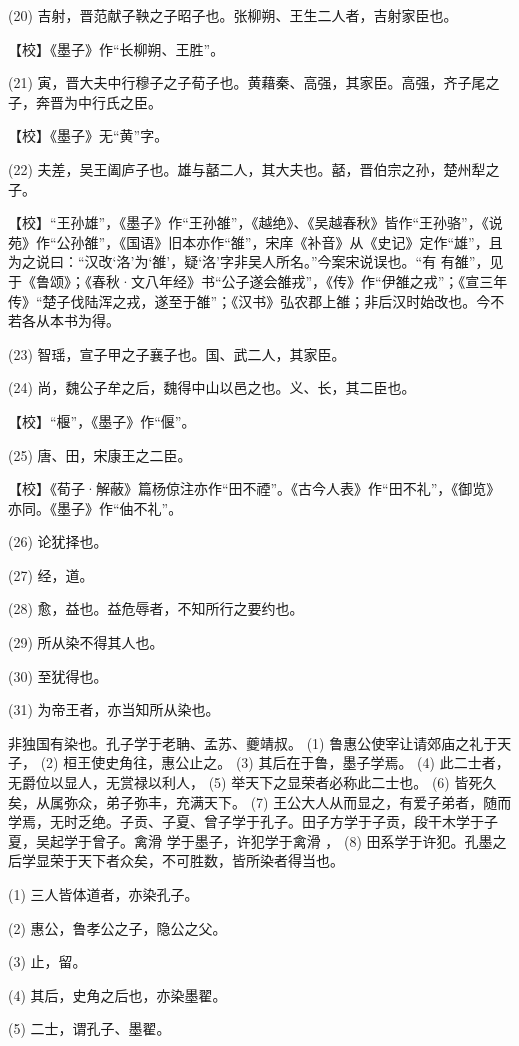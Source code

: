\documentclass[12pt,UTF8]{ctexbook}
\begin{document}
(20) 吉射，晋范献子鞅之子昭子也。张柳朔、王生二人者，吉射家臣也。

【校】《墨子》作“长柳朔、王胜”。

(21) 寅，晋大夫中行穆子之子荀子也。黄藉秦、高强，其家臣。高强，齐子尾之子，奔晋为中行氏之臣。

【校】《墨子》无“黄”字。

(22) 夫差，吴王阖庐子也。雄与嚭二人，其大夫也。嚭，晋伯宗之孙，楚州犁之子。

【校】“王孙雄”，《墨子》作“王孙雒”，《越绝》、《吴越春秋》皆作“王孙骆”，《说苑》作“公孙雒”，《国语》旧本亦作“雒”，宋庠《补音》从《史记》定作“雄”，且为之说曰：“汉改‘洛’为‘雒’，疑‘洛’字非吴人所名。”今案宋说误也。“有 有雒”，见于《鲁颂》；《春秋·文八年经》书“公子遂会雒戎”，《传》作“伊雒之戎”；《宣三年传》“楚子伐陆浑之戎，遂至于雒”；《汉书》弘农郡上雒；非后汉时始改也。今不若各从本书为得。

(23) 智瑶，宣子甲之子襄子也。国、武二人，其家臣。

(24) 尚，魏公子牟之后，魏得中山以邑之也。义、长，其二臣也。

【校】“椻”，《墨子》作“偃”。

(25) 唐、田，宋康王之二臣。

【校】《荀子·解蔽》篇杨倞注亦作“田不禋”。《古今人表》作“田不礼”，《御览》亦同。《墨子》作“伷不礼”。

(26) 论犹择也。

(27) 经，道。

(28) 愈，益也。益危辱者，不知所行之要约也。

(29) 所从染不得其人也。

(30) 至犹得也。

(31) 为帝王者，亦当知所从染也。

非独国有染也。孔子学于老聃、孟苏、夔靖叔。 (1) 鲁惠公使宰让请郊庙之礼于天子， (2) 桓王使史角往，惠公止之。 (3) 其后在于鲁，墨子学焉。 (4) 此二士者，无爵位以显人，无赏禄以利人， (5) 举天下之显荣者必称此二士也。 (6) 皆死久矣，从属弥众，弟子弥丰，充满天下。 (7) 王公大人从而显之，有爱子弟者，随而学焉，无时乏绝。子贡、子夏、曾子学于孔子。田子方学于子贡，段干木学于子夏，吴起学于曾子。禽滑 学于墨子，许犯学于禽滑 ， (8) 田系学于许犯。孔墨之后学显荣于天下者众矣，不可胜数，皆所染者得当也。

(1) 三人皆体道者，亦染孔子。

(2) 惠公，鲁孝公之子，隐公之父。

(3) 止，留。

(4) 其后，史角之后也，亦染墨翟。

(5) 二士，谓孔子、墨翟。
\end{document}
